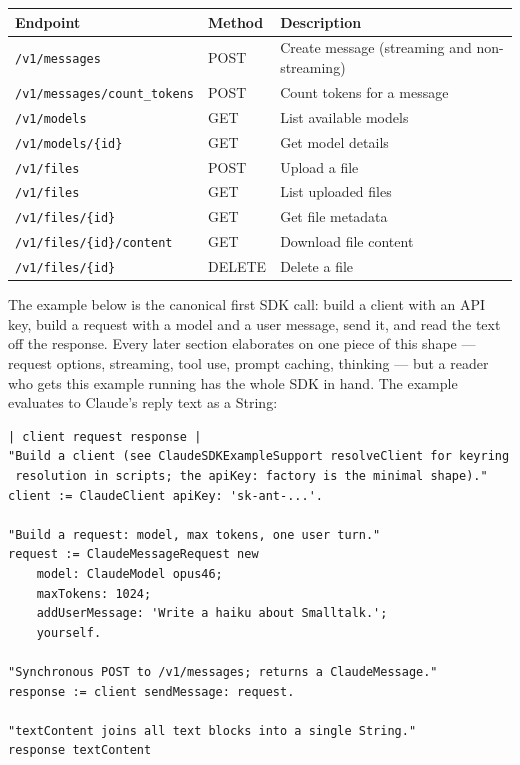 \documentclass[a4paper,10pt,fleqn]{article}
\begin{document}
\begin{center}
\begin{tabular}{@{}lll@{}}
\toprule
\textbf{Endpoint} & \textbf{Method} & \textbf{Description} \\
\midrule
\texttt{/v1/messages}              & POST & Create message (streaming and non-streaming) \\
\texttt{/v1/messages/count\_tokens} & POST & Count tokens for a message \\
\texttt{/v1/models}                & GET  & List available models \\
\texttt{/v1/models/\{id\}}        & GET  & Get model details \\
\texttt{/v1/files}               & POST & Upload a file \\
\texttt{/v1/files}               & GET  & List uploaded files \\
\texttt{/v1/files/\{id\}}        & GET  & Get file metadata \\
\texttt{/v1/files/\{id\}/content} & GET & Download file content \\
\texttt{/v1/files/\{id\}}        & DELETE & Delete a file \\
\bottomrule
\end{tabular}
\end{center}

The example below is the canonical first SDK call: build a client with
an API key, build a request with a model and a user message, send it,
and read the text off the response.  Every later section elaborates on
one piece of this shape --- request options, streaming, tool use,
prompt caching, thinking --- but a reader who gets this example running
has the whole SDK in hand.  The example evaluates to Claude's reply
text as a String:

\begin{lstlisting}[language={}]
| client request response |
"Build a client (see ClaudeSDKExampleSupport resolveClient for keyring
 resolution in scripts; the apiKey: factory is the minimal shape)."
client := ClaudeClient apiKey: 'sk-ant-...'.

"Build a request: model, max tokens, one user turn."
request := ClaudeMessageRequest new
    model: ClaudeModel opus46;
    maxTokens: 1024;
    addUserMessage: 'Write a haiku about Smalltalk.';
    yourself.

"Synchronous POST to /v1/messages; returns a ClaudeMessage."
response := client sendMessage: request.

"textContent joins all text blocks into a single String."
response textContent
\end{lstlisting}
\end{document}
